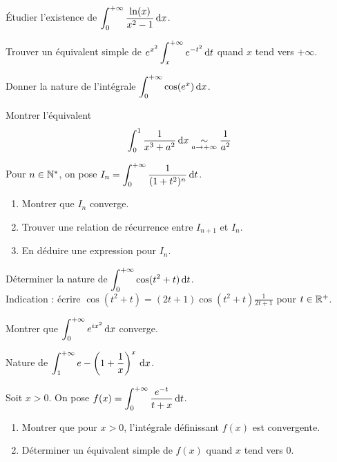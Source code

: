 \documentclass[12pt,a4paper]{exo_book}
\begin{document}
\begin{exo}
    Étudier l'existence de $\displaystyle \int_0^{+\infty} \frac{\ln(x)}{x^2 - 1} {\rm \, d} x$.
\end{exo}

\begin{exo}
    Trouver un équivalent simple de $\displaystyle e^{x^2}\int_x^{+\infty} e^{-t^2} {\rm \, d} t$ quand $x$ tend vers $+\infty$.
\end{exo}

\begin{exo}
    Donner la nature de l'intégrale $\displaystyle \int_{0}^{+\infty} \cos(e^x) {\rm \, d} x$.
\end{exo}

\begin{exo}
    Montrer l'équivalent
    \[\int_0^1 \frac{1}{x^3 + a^2} {\rm \, d} x \underset{a \to +\infty}{\sim} \frac{1}{a^2}\]
\end{exo}

\begin{exo}
    Pour $n \in \mathbb{N}^*$, on pose $\displaystyle I_n = \int_0^{+\infty} \frac{1}{(1+t^2)^n} {\rm \, d} t$.
    \begin{enumerate}
        \item Montrer que $I_n$ converge.
        \item Trouver une relation de récurrence entre $I_{n+1}$ et $I_n$.
        \item En déduire une expression pour $I_n$.
    \end{enumerate}
\end{exo}

\begin{exo}
    Déterminer la nature de $\displaystyle \int_0^{+\infty} \cos(t^2 + t) {\rm \, d} t$. \\
    Indication : écrire $\cos(t^2 + t) = (2t+1)\cos(t^2 + t)\frac{1}{2t+1}$ pour $t \in \mathbb{R}^+$.
\end{exo}

\begin{exo}
    Montrer que $\displaystyle \int_0^{+\infty} e^{ix^2} {\rm \, d} x$ converge.
\end{exo}

\begin{exo}
    Nature de $\displaystyle \int_1^{+\infty} e - \left(1 + \frac{1}{x}\right)^x {\rm \, d} x$.
\end{exo}

\begin{exo}
    Soit $x > 0$. On pose $f(x) = \displaystyle \int_0^{+\infty} \frac{e^{-t}}{t + x} {\rm \, d} t$.
    \begin{enumerate}
        \item Montrer que pour $x > 0$, l'intégrale définissant $f(x)$ est convergente.
        \item Déterminer un équivalent simple de $f(x)$ quand $x$ tend vers 0.
    \end{enumerate}
\end{exo}
\end{document}
